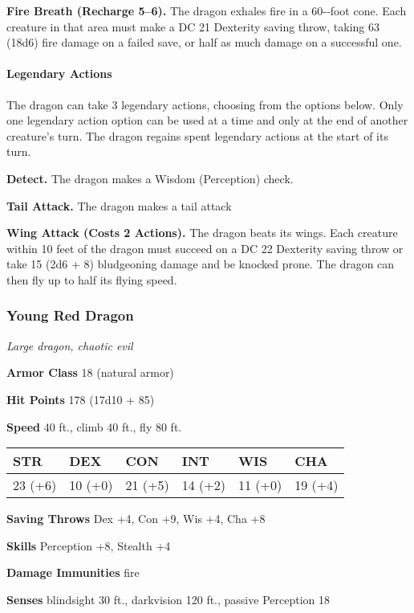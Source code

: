\documentclass[
]{article}
\begin{document}
\textbf{Fire Breath (Recharge 5--6).} The dragon exhales fire in a
60-­‐foot cone. Each creature in that area must make a DC 21 Dexterity
saving throw, taking 63 (18d6) fire damage on a failed save, or half as
much damage on a successful one.

\hypertarget{legendary-actions-7}{%
\paragraph{Legendary Actions}\label{legendary-actions-7}}

The dragon can take 3 legendary actions, choosing from the options
below. Only one legendary action option can be used at a time and only
at the end of another creature's turn. The dragon regains spent
legendary actions at the start of its turn.

\textbf{Detect.} The dragon makes a Wisdom (Perception) check.

\textbf{Tail Attack.} The dragon makes a tail attack

\textbf{Wing Attack (Costs 2 Actions).} The dragon beats its wings. Each
creature within 10 feet of the dragon must succeed on a DC 22 Dexterity
saving throw or take 15 (2d6 + 8) bludgeoning damage and be knocked
prone. The dragon can then fly up to half its flying speed.

\hypertarget{young-red-dragon}{%
\subsubsection{Young Red Dragon}\label{young-red-dragon}}

\emph{Large dragon, chaotic evil}

\textbf{Armor Class} 18 (natural armor)

\textbf{Hit Points} 178 (17d10 + 85)

\textbf{Speed} 40 ft., climb 40 ft., fly 80 ft.

\begin{longtable}[]{@{}llllll@{}}
\toprule
STR & DEX & CON & INT & WIS & CHA\tabularnewline
\midrule
\endhead
23 (+6) & 10 (+0) & 21 (+5) & 14 (+2) & 11 (+0) & 19 (+4)\tabularnewline
\bottomrule
\end{longtable}

\textbf{Saving Throws} Dex +4, Con +9, Wis +4, Cha +8

\textbf{Skills} Perception +8, Stealth +4

\textbf{Damage Immunities} fire

\textbf{Senses} blindsight 30 ft., darkvision 120 ft., passive
Perception 18
\end{document}
